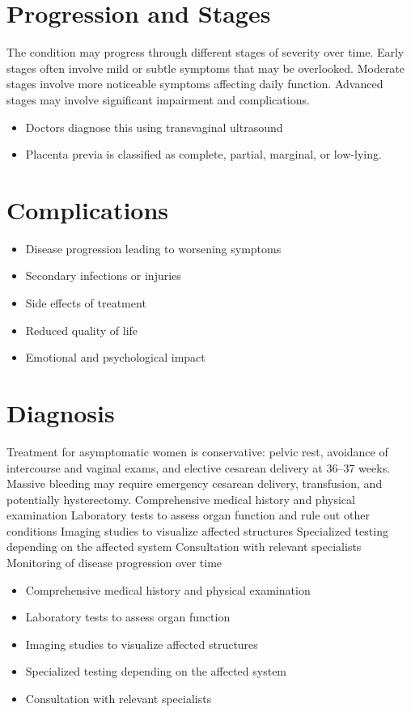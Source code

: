 \section{Progression and Stages}
The condition may progress through different stages of severity over time. Early stages often involve mild or subtle symptoms that may be overlooked. Moderate stages involve more noticeable symptoms affecting daily function. Advanced stages may involve significant impairment and complications.

\begin{itemize}[noitemsep]
  \item Doctors diagnose this using transvaginal ultrasound
  \item Placenta previa is classified as complete, partial, marginal, or low-lying.
\end{itemize}
\section{Complications}
\begin{itemize}[noitemsep]
  \item Disease progression leading to worsening symptoms
  \item Secondary infections or injuries
  \item Side effects of treatment
  \item Reduced quality of life
  \item Emotional and psychological impact
\end{itemize}
\section{Diagnosis}
Treatment for asymptomatic women is conservative: pelvic rest, avoidance of intercourse and vaginal exams, and elective cesarean delivery at 36--37 weeks. Massive bleeding may require emergency cesarean delivery, transfusion, and potentially hysterectomy. Comprehensive medical history and physical examination Laboratory tests to assess organ function and rule out other conditions Imaging studies to visualize affected structures Specialized testing depending on the affected system Consultation with relevant specialists Monitoring of disease progression over time

\begin{itemize}[noitemsep]
  \item Comprehensive medical history and physical examination
  \item Laboratory tests to assess organ function
  \item Imaging studies to visualize affected structures
  \item Specialized testing depending on the affected system
  \item Consultation with relevant specialists
\end{itemize}
